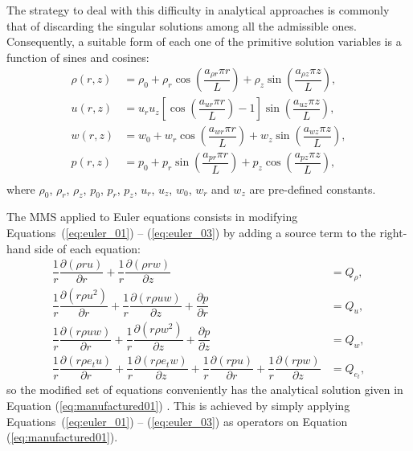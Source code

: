 \documentclass[10pt]{article}
\newcommand{\Diff}[2] {\dfrac{\partial( #1)}{\partial #2}}
\newcommand{\diff}[2] {\dfrac{\partial #1}{\partial #2}}
\begin{document}
The strategy to deal with this difficulty in analytical approaches is commonly that of discarding the singular solutions among all the admissible ones. %
Consequently, a suitable form of each one of the primitive solution variables is a function of sines and cosines:
\begin{equation}
 \label{eq:manufactured01}
\begin{split}
\rho(r,z)&= \rho_0+\rho_r \cos\left(\dfrac{a_{\rho r} \pi r}{L}\right)+\rho_z \sin\left(\dfrac{a_{\rho z} \pi z}{L}\right),\\
u(r,z)&= u_r u_z \left[\cos\left(\dfrac{a_{ur} \pi r}{L}\right)-1\right]\sin\left(\dfrac{a_{uz} \pi z}{L}\right),\\
w(r,z)&=w_0+w_r \cos\left(\dfrac{a_{w r} \pi r}{L}\right)+w_z \sin\left(\dfrac{a_{w z} \pi z}{L}\right),\\
p(r,z)&=p_0+p_r \sin\left(\dfrac{a_{p r} \pi r}{L}\right)+p_z \cos\left(\dfrac{a_{p z} \pi z}{L}\right),\\
\end{split}
\end{equation}
%
where $\rho_0$, $\rho_r$,  $\rho_z$, $p_0$, $p_r$, $p_z$, $u_r$, $u_z$, $w_0$, $w_r$ and $w_z$ are pre-defined constants.

The MMS applied to Euler equations consists in modifying Equations~(\ref{eq:euler_01}) -- (\ref{eq:euler_03}) by adding a source term to the right-hand side of each equation:
\begin{equation}
 \label{eq:ns2d_mod}
\begin{split}
 \dfrac{1}{r} \Diff{\rho r u}{r}+ \dfrac{1}{r}\Diff{\rho r w}{z}&=Q_\rho, \\
\dfrac{1}{r}\Diff{r \rho u^2 }{r}+ \dfrac{1}{r}\Diff{r \rho u w}{z}+\diff{p}{r} &=Q_u,\\
 \dfrac{1}{r}\Diff{r \rho  u w }{r}+ \dfrac{1}{r}\Diff{r \rho w^2 }{z}+\diff{p}{z} &=Q_w,\\
\dfrac{1}{r}\Diff{r \rho e_t u}{ r}+\dfrac{1}{r}\Diff{r \rho e_t w}{z} +\dfrac{1}{r}\Diff{r p  u}{ r}+\dfrac{1}{r}\Diff{r p w}{z}&=Q_{e_t},
\end{split}
\end{equation}
so the modified set of equations conveniently has the analytical solution given in Equation (\ref{eq:manufactured01}) \cite{Roy2002}. This is achieved by simply applying Equations~(\ref{eq:euler_01}) -- (\ref{eq:euler_03}) as operators on Equation (\ref{eq:manufactured01}).
\end{document}
